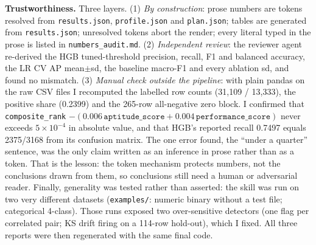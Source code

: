 \documentclass[10pt]{article}
\begin{document}
\textbf{Trustworthiness.} Three layers. (1) \emph{By construction}: prose numbers are tokens resolved from \texttt{results.json}, \texttt{profile.json} and \texttt{plan.json}; tables are generated from \texttt{results.json}; unresolved tokens abort the render; every literal typed in the prose is listed in \texttt{numbers\_audit.md}. (2) \emph{Independent review}: the reviewer agent re-derived the HGB tuned-threshold precision, recall, F1 and balanced accuracy, the LR CV AP mean$\pm$sd, the baseline macro-F1 and every ablation sd, and found no mismatch. (3) \emph{Manual check outside the pipeline}: with plain pandas on the raw CSV files I recomputed the labelled row counts (31{,}109 / 13{,}333), the positive share (0.2399) and the 265-row all-negative zero block. I confirmed that \texttt{composite\_rank} $- (0.006\,\texttt{aptitude\_score} + 0.004\,\texttt{performance\_score})$ never exceeds $5\times10^{-4}$ in absolute value, and that HGB's reported recall 0.7497 equals 2375/3168 from its confusion matrix. The one error found, the ``under a quarter'' sentence, was the only claim written as an inference in prose rather than as a token. That is the lesson: the token mechanism protects numbers, not the conclusions drawn from them, so conclusions still need a human or adversarial reader. Finally, generality was tested rather than asserted: the skill was run on two very different datasets (\texttt{examples/}: numeric binary without a test file; categorical 4-class). Those runs exposed two over-sensitive detectors (one flag per correlated pair; KS drift firing on a 114-row hold-out), which I fixed. All three reports were then regenerated with the same final code.
\end{document}
